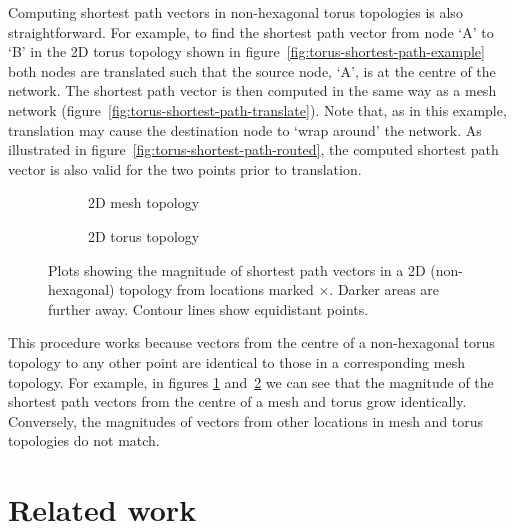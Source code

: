 			Computing shortest path vectors in non-hexagonal torus topologies is also
			straightforward. For example, to find the shortest path vector from node
			`A' to `B' in the 2D torus topology shown in figure~\ref{fig:torus-shortest-path-example} both nodes are translated such that
			the source node, `A', is at the centre of the network. The shortest path
			vector is then computed in the same way as a mesh network (figure~\ref{fig:torus-shortest-path-translate}). Note that, as in this example,
			translation may cause the destination node to `wrap around' the network.
			As illustrated in figure~\ref{fig:torus-shortest-path-routed}, the
			computed shortest path vector is also valid for the two points prior to
			translation.
			
			\begin{figure}
				\center
				
				\begin{subfigure}{\linewidth}
					\center
					\caption{2D mesh topology}
					\label{fig:distance-map-mesh}
				\end{subfigure}
				
				\vspace{1em}
				
				\begin{subfigure}{\linewidth}
					\center
					\caption{2D torus topology}
					\label{fig:distance-map-torus}
				\end{subfigure}
				
				\caption[Magnitudes of shortest path vectors in a 2D mesh.]%
				{Plots showing the magnitude of shortest path vectors in a 2D
				(non-hexagonal) topology from locations marked {\color{red}$\times$}.
				Darker areas are further away. Contour lines show equidistant points.}
				
				\label{fig:distance-map}
			\end{figure}
			
			This procedure works because vectors from the centre of a non-hexagonal
			torus topology to any other point are identical to those in a
			corresponding mesh topology. For example, in figures
			\ref{fig:distance-map-mesh} and~\ref{fig:distance-map-torus} we can see
			that the magnitude of the shortest path vectors from the centre of a mesh
			and torus grow identically. Conversely, the magnitudes of vectors from
			other locations in mesh and torus topologies do not match.
		
	\section{Related work}
		
